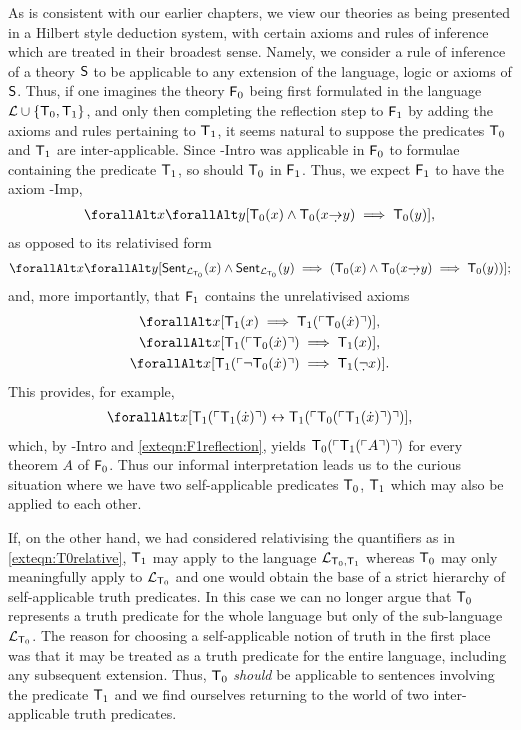 \documentclass[UKenglish,cleveref,DIV=12]{scrartcl}
\let\forall\forallAlt
\theoremstyle{definition}
\theoremstyle{definition}
\begin{document}
As is consistent with our earlier chapters, we view our theories as being
presented in a Hilbert style deduction system, with certain axioms and rules of inference which
are treated in their broadest sense. Namely, we consider a rule of inference of a
theory $\mathsf{S}$ to be applicable to any extension of the language, logic or
axioms of $\mathsf{S}$. Thus, if one imagines the theory $\mathsf{F}_0$ being first
formulated in the language $\mathcal{L}\cup\{\mathsf{T}_0,\mathsf{T}_1\}$, and only then completing
the reflection step to $\mathsf{F}_1$ by adding the axioms and rules pertaining to
$\mathsf{T}_1$, it seems natural to suppose the predicates $\mathsf{T}_0$ and $\mathsf{T}_1$ are
inter-applicable. Since -Intro was applicable in $\mathsf{F}_0$ to formulae
containing the predicate $\mathsf{T}_1$, so should $\mathsf{T}_0$ in $\mathsf{F}_1$. Thus, we expect
$\mathsf{F}_1$ to have the axiom -Imp,
\begin{align*}
  \forall x\forall y[ \T_0(x)\land \T_0(x\dimplies y)\implies \T_0(y)],
\end{align*}
as opposed to its relativised form
\begin{align}\label{exteqn:T0relative}
  \forall x\forall y[\Sent_{\L_{\T_0}}(x)\land\Sent_{\L_{\T_0}}(y)\implies ( \T_0(x)\land \T_0(x\dimplies y)\implies \T_0(y))];
\end{align}
and, more importantly, that $\mathsf{F}_1$ contains the unrelativised axioms
\begin{gather}
  \forall x[\T_1(x)\implies \T_1(\gn{\T_0(\dot x)})],\nonumber\\
  \forall x[\T_1(\gn{\T_0(\dot x)})\implies \T_1(x)],\label{exteqn:F1ax1}\\
  \forall x[\T_1(\gn{\lnot \T_0(\dot x)})\implies \T_1(\dlnot x)].\nonumber
\end{gather}
This provides, for example,
\begin{align*}
  \forall x[\T_1(\gn{\T_1(\dot x)})\equi \T_1(\gn{\T_0(\gn{\T_1(\dot x)})})],
\end{align*}
which, by -Intro and \cref{exteqn:F1reflection}, yields
$\mathsf{T}_0(\ulcorner{\mathsf{T}_1(\ulcorner{A}\urcorner)}\urcorner)$ for every theorem $A$ of $\mathsf{F}_0$. Thus our informal
interpretation leads us to the curious situation where we have two
self-applicable predicates $\mathsf{T}_0$, $\mathsf{T}_1$ which may also be applied to each other.

If, on the other hand, we had considered relativising the quantifiers as in \cref{exteqn:T0relative},
$\mathsf{T}_1$ may apply to the language $\mathcal{L}_{\mathsf{T}_0,\mathsf{T}_1}$ whereas $\mathsf{T}_0$ may only
meaningfully apply to $\mathcal{L}_{\mathsf{T}_0}$ and one would obtain the base of a strict
hierarchy of self-applicable truth predicates. In this case we can no longer
argue that $\mathsf{T}_0$ represents a truth predicate for the whole language but only of
the sub-language $\mathcal{L}_{\mathsf{T}_0}$. The reason for choosing a self-applicable
notion of truth in the first place was that it may be treated as a truth
predicate for the entire language, including any subsequent extension. Thus,
$\mathsf{T}_0$ {\em should} be applicable to sentences involving the predicate $\mathsf{T}_1$ and
we find ourselves returning to the world of two inter-applicable truth
predicates.
\end{document}
